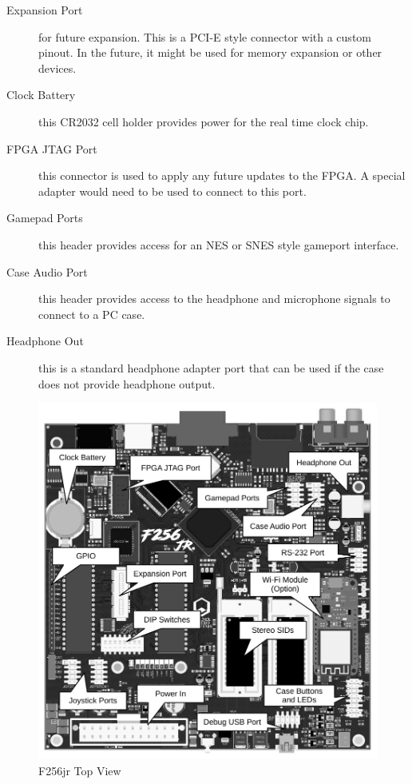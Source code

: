 \documentclass[oneside]{book}
\begin{document}
\begin{description}
    \item[Expansion Port] for future expansion. This is a PCI-E style connector with a custom pinout. In the future, it might be used for memory expansion or other devices.

    \item[Clock Battery] this CR2032 cell holder provides power for the real time clock chip.

    \item[FPGA JTAG Port] this connector is used to apply any future updates to the FPGA. A special adapter would need to be used to connect to this port.

    \item[Gamepad Ports] this header provides access for an NES or SNES style gameport interface.

    \item[Case Audio Port] this header provides access to the headphone and microphone signals to connect to a PC case.

    \item[Headphone Out] this is a standard headphone adapter port that can be used if the case does not provide headphone output.
\end{description}

\begin{figure}[ht]
    \begin{center}
        \includegraphics[scale=0.75]{images/f256_render_annotated_top.pdf}
    \end{center}
    \caption{F256jr Top View}
    \label{fig:top}
\end{figure}
\end{document}
